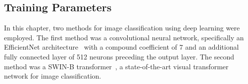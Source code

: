 \begin{table}[h]
	\centering
	\caption{Number of images per diagnosis in each dataset.}
	\label{tab:generalisation_datasets}
\end{table}


\subsection{Training Parameters}
\label{subsec:generalisation_training}
In this chapter, two methods for image classification using deep learning were employed. The first method was a convolutional neural network, specifically an EfficientNet architecture~\citep{tan2019efficientnet} with a compound coefficient of 7 and an additional fully connected layer of 512 neurons preceding the output layer. The second method was a SWIN-B transformer~\citep{liu2021swin}, a state-of-the-art visual transformer network for image classification.

